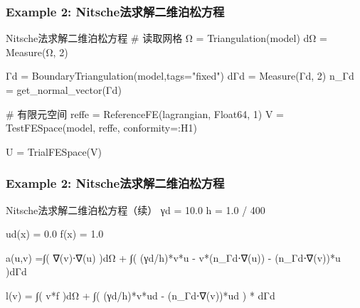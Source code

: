 \documentclass[lang=en,aspectratio=43,theme=default,logo=on]{simplebeamer}
\begin{document}
\begin{frame}[fragile]
    \frametitle{Example 2: Nitsche法求解二维泊松方程}
    \begin{codex}{1}{Nitsche法求解二维泊松方程}
# 读取网格
Ω = Triangulation(model)
dΩ = Measure(Ω, 2)

Γd = BoundaryTriangulation(model,tags="fixed")
dΓd = Measure(Γd, 2)
n_Γd = get_normal_vector(Γd)

# 有限元空间
reffe = ReferenceFE(lagrangian, Float64, 1)
V = TestFESpace(model, reffe, conformity=:H1)

U = TrialFESpace(V)
\end{codex}
\end{frame}

\begin{frame}[fragile]
    \frametitle{Example 2: Nitsche法求解二维泊松方程}
\begin{codex}{14}{Nitsche法求解二维泊松方程（续）}
γd = 10.0
h = 1.0 / 400

ud(x) = 0.0
f(x) = 1.0

a(u,v) =∫( ∇(v)⋅∇(u) )dΩ +
∫( (γd/h)*v*u  - v*(n_Γd⋅∇(u)) - (n_Γd⋅∇(v))*u )dΓd

l(v) =  ∫( v*f )dΩ  +
∫( (γd/h)*v*ud - (n_Γd⋅∇(v))*ud ) * dΓd
\end{codex}
\end{frame}
\end{document}
